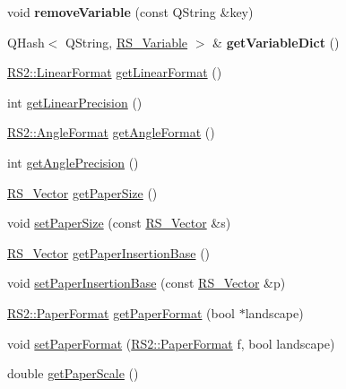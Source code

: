 \begin{DoxyCompactItemize}
\item 
\hypertarget{classRS__Graphic_a23e12a7935606703eb95f19e5fe29363}{void {\bfseries remove\-Variable} (const Q\-String \&key)}\label{classRS__Graphic_a23e12a7935606703eb95f19e5fe29363}

\item 
\hypertarget{classRS__Graphic_a4e66f859b184b54650d6ebed275baaf7}{Q\-Hash$<$ Q\-String, \hyperlink{classRS__Variable}{R\-S\-\_\-\-Variable} $>$ \& {\bfseries get\-Variable\-Dict} ()}\label{classRS__Graphic_a4e66f859b184b54650d6ebed275baaf7}

\item 
\hyperlink{classRS2_a0fa0506f1e870c169e8d8c1d58d3fa6e}{R\-S2\-::\-Linear\-Format} \hyperlink{classRS__Graphic_a22abb7c90d0b1c344a737e56f817bc9c}{get\-Linear\-Format} ()
\item 
int \hyperlink{classRS__Graphic_ab0d83770e835c42810480a4585e24b82}{get\-Linear\-Precision} ()
\item 
\hyperlink{classRS2_a9c7a07b03f910b04154536a28c151277}{R\-S2\-::\-Angle\-Format} \hyperlink{classRS__Graphic_ae8d5f96b0c2fe1b202226e20ea3d8290}{get\-Angle\-Format} ()
\item 
int \hyperlink{classRS__Graphic_a10d22f4e1095ac88108e9cdca4d8e1c1}{get\-Angle\-Precision} ()
\item 
\hyperlink{classRS__Vector}{R\-S\-\_\-\-Vector} \hyperlink{classRS__Graphic_ac1a8bdbee3f9a7de06254f43fe8801a1}{get\-Paper\-Size} ()
\item 
void \hyperlink{classRS__Graphic_ae28d9cf3a5c0a2768c0897bf997c5e42}{set\-Paper\-Size} (const \hyperlink{classRS__Vector}{R\-S\-\_\-\-Vector} \&s)
\item 
\hyperlink{classRS__Vector}{R\-S\-\_\-\-Vector} \hyperlink{classRS__Graphic_a890b743792e8dff37b3ca39b49e021b8}{get\-Paper\-Insertion\-Base} ()
\item 
void \hyperlink{classRS__Graphic_aff41a516c8d8cb9edad6812bae6cfa91}{set\-Paper\-Insertion\-Base} (const \hyperlink{classRS__Vector}{R\-S\-\_\-\-Vector} \&p)
\item 
\hyperlink{classRS2_a99636ecac997160f1e2982859a043cb4}{R\-S2\-::\-Paper\-Format} \hyperlink{classRS__Graphic_a8d50dc9750e59f0edec003b93d51b587}{get\-Paper\-Format} (bool $\ast$landscape)
\item 
void \hyperlink{classRS__Graphic_a1f065fb8865c9219de745011add5499d}{set\-Paper\-Format} (\hyperlink{classRS2_a99636ecac997160f1e2982859a043cb4}{R\-S2\-::\-Paper\-Format} f, bool landscape)
\item 
double \hyperlink{classRS__Graphic_ae5ce9c846bd2acbb1ee3fddef0f5f01b}{get\-Paper\-Scale} ()

\end{DoxyCompactItemize}
